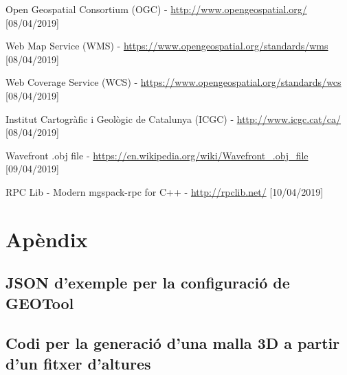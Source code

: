 \documentclass[10pt,a4paper]{article}
\begin{document}
\begin{thebibliography}{11}

Open Geospatial Consortium (OGC) -  \url{http://www.opengeospatial.org/} [08/04/2019]

Web Map Service (WMS) -  \url{https://www.opengeospatial.org/standards/wms} [08/04/2019]

Web Coverage Service (WCS) -  \url{https://www.opengeospatial.org/standards/wcs} [08/04/2019]

Institut Cartogràfic i Geològic de Catalunya (ICGC) - \url{http://www.icgc.cat/ca/} [08/04/2019]

Wavefront .obj file - \url{https://en.wikipedia.org/wiki/Wavefront_.obj_file} [09/04/2019]

RPC Lib - Modern mgspack-rpc for C++ - \url{http://rpclib.net/} [10/04/2019]


\end{thebibliography}

\newpage
\appendix

\section*{Apèndix}

\setcounter{section}{1}

\subsection{JSON d'exemple per la configuració de GEOTool}
\label{appendix:geotoolconfig}


\subsection{Codi per la generació d'una malla 3D a partir d'un fitxer d'altures}
\label{appendix:generateobj}

\end{document}
